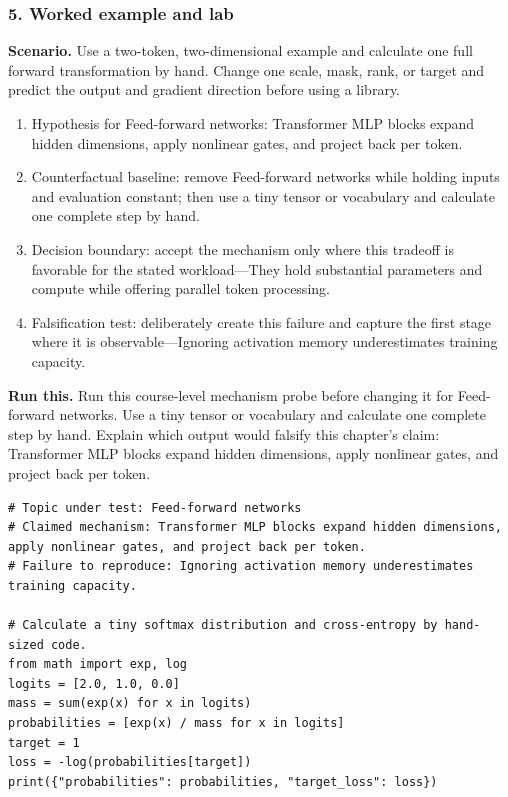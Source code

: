 \subsubsection*{5. Worked example and lab}
\textbf{Scenario.} Use a two-token, two-dimensional example and calculate one full forward transformation by hand. Change one scale, mask, rank, or target and predict the output and gradient direction before using a library.
\begin{enumerate}
\item Hypothesis for Feed-forward networks: Transformer MLP blocks expand hidden dimensions, apply nonlinear gates, and project back per token.
\item Counterfactual baseline: remove Feed-forward networks while holding inputs and evaluation constant; then use a tiny tensor or vocabulary and calculate one complete step by hand.
\item Decision boundary: accept the mechanism only where this tradeoff is favorable for the stated workload—They hold substantial parameters and compute while offering parallel token processing.
\item Falsification test: deliberately create this failure and capture the first stage where it is observable—Ignoring activation memory underestimates training capacity.
\end{enumerate}
\textbf{Run this.} Run this course-level mechanism probe before changing it for Feed-forward networks. Use a tiny tensor or vocabulary and calculate one complete step by hand. Explain which output would falsify this chapter's claim: Transformer MLP blocks expand hidden dimensions, apply nonlinear gates, and project back per token.
\begin{Verbatim}[fontsize=\scriptsize]
# Topic under test: Feed-forward networks
# Claimed mechanism: Transformer MLP blocks expand hidden dimensions, apply nonlinear gates, and project back per token.
# Failure to reproduce: Ignoring activation memory underestimates training capacity.

# Calculate a tiny softmax distribution and cross-entropy by hand-sized code.
from math import exp, log
logits = [2.0, 1.0, 0.0]
mass = sum(exp(x) for x in logits)
probabilities = [exp(x) / mass for x in logits]
target = 1
loss = -log(probabilities[target])
print({"probabilities": probabilities, "target_loss": loss})
\end{Verbatim}
